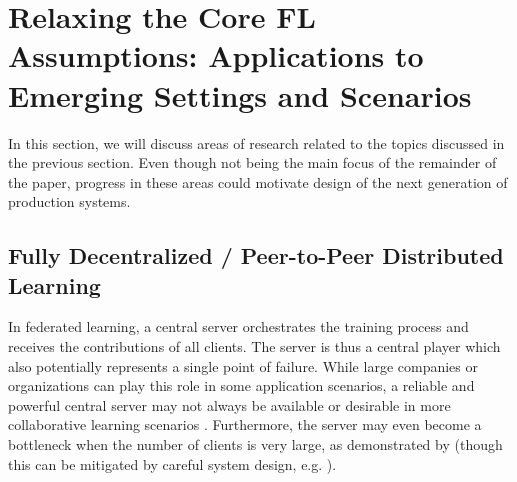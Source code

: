 \documentclass[11pt]{article}
\begin{document}
\pagebreak
\section{Relaxing the Core FL Assumptions: Applications to Emerging Settings and Scenarios}
\label{sec:relaxing}


In this section, we will discuss areas of research related to the topics discussed in the previous section. Even though not being the main focus of the remainder of the paper, progress in these areas could motivate design of the next generation of production systems.

\subsection{Fully Decentralized / Peer-to-Peer Distributed Learning}
\label{sec:decentralized}

In federated learning, a central server orchestrates the training process and receives the contributions of all clients. The server is thus a central player which also potentially represents a single point of failure. While large companies or organizations can play this role in some application scenarios, a reliable and powerful central server may not always be available or desirable in more collaborative learning scenarios \citep{Vanhaesebrouck2017}. Furthermore, the server may even become a bottleneck when the number of clients is very large, as demonstrated by \citet{Lian2017b} (though this can be mitigated by careful system design, e.g. \citep{bonawitz19sysml}).
\end{document}
